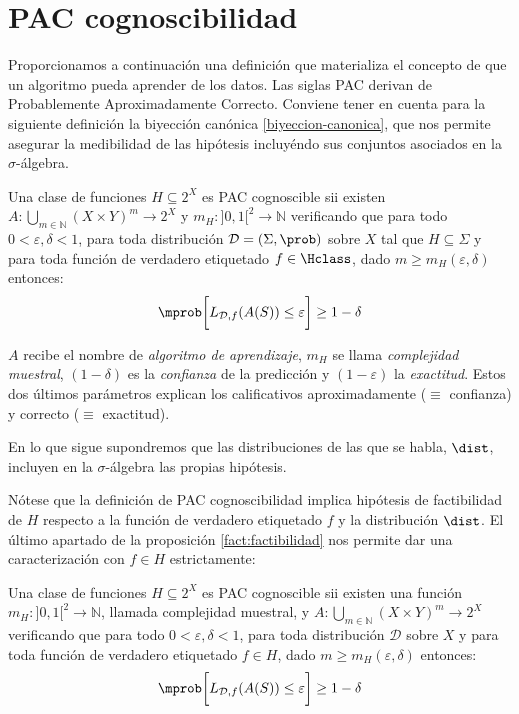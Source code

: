 \section{PAC cognoscibilidad}
Proporcionamos a continuación una definición que materializa el concepto de que un algoritmo pueda aprender de los datos. Las
siglas PAC derivan de Probablemente Aproximadamente Correcto. Conviene tener en cuenta para la siguiente definición la
biyección canónica \ref{biyeccion-canonica}, que nos permite asegurar la medibilidad de las hipótesis incluyéndo sus conjuntos
asociados en la $\sigma$-álgebra.

\begin{definition}
Una clase de funciones $H \subseteq 2^X$ es PAC cognoscible sii existen $A: \underset{m\in \mathbb{N}}{\bigcup} (X\times Y)^m \rightarrow 2^X$ 
y $m_{H} : ]0,1[^2\rightarrow \mathbb{N}$ verificando que para todo
$0 < \varepsilon, \delta < 1$, para toda distribución $\mathcal{D}=(\Sigma, \prob)$ sobre $X$ tal que $H\subseteq \Sigma$
y para toda función de verdadero etiquetado $f\in \Hclass$, dado $m \ge m_H(\varepsilon, \delta)$ entonces:
\[
  \mprob \bigg[L_{\mathcal{D},f}(A(S)) \le \varepsilon \bigg] \ge 1-\delta
\]
\label{def:pac-original}
\end{definition}

$A$ recibe el nombre de \textit{algoritmo de aprendizaje}, $m_H$ se llama \textit{complejidad muestral}, $(1-\delta)$ es la 
\textit{confianza} de la predicción y $(1-\varepsilon)$ la \textit{exactitud}. Estos dos últimos parámetros explican los 
calificativos aproximadamente ($\equiv$ confianza) y correcto ($\equiv$ exactitud).

En lo que sigue supondremos que las distribuciones de las que se habla, $\dist$, incluyen en la $\sigma$-álgebra las propias
hipótesis.

Nótese que la definición de PAC cognoscibilidad implica hipótesis de factibilidad de $H$ respecto a la función de verdadero
etiquetado $f$ y la distribución $\dist$. El último apartado de la proposición \ref{fact:factibilidad} 
nos permite dar una caracterización con $f\in H$ estrictamente:

\begin{charact}
Una clase de funciones $H \subseteq 2^X$ es PAC cognoscible sii existen una función 
$m_{H} : ]0,1[^2\rightarrow \mathbb{N}$, llamada complejidad muestral, y 
$A: \underset{m\in \mathbb{N}}{\bigcup} (X\times Y)^m \rightarrow 2^X$ verificando que para todo
$0 < \varepsilon, \delta < 1$, para toda distribución $\mathcal{D}$ sobre $X$ y para toda función de 
verdadero etiquetado $f\in H$, dado $m \ge m_H(\varepsilon, \delta)$ entonces:
\[
  \mprob \bigg[L_{\mathcal{D},f}(A(S)) \le \varepsilon \bigg] \ge 1-\delta
\]
\label{def:pac}
\end{charact}

